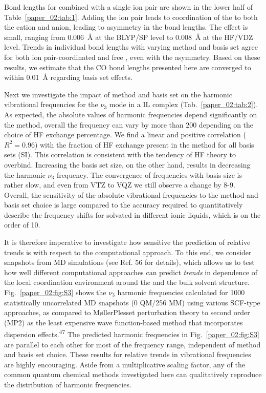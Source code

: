 Bond lengths for  combined with a single ion pair are shown in the lower half of Table~\ref{paper_02:tab:1}. Adding the ion pair leads to coordination of the  to both the cation and anion, leading to asymmetry in the  bond lengths. The effect is small, ranging from \SI{0.006}{\angstrom} at the BLYP/SP level to \SI{0.008}{\angstrom} at the HF/VDZ level. Trends in individual  bond lengths with varying method and basis set agree for both ion pair-coordinated  and free , even with the asymmetry. Based on these results, we estimate that the CO bond lengths presented here are converged to within \SI{0.01}{\angstrom} regarding basis set effects.

Next we investigate the impact of method and basis set on the harmonic vibrational frequencies for the \(\nu_{3}\) mode in a \textendash{}IL complex (Tab.~\ref{paper_02:tab:2}). As expected, the absolute values of harmonic frequencies depend significantly on the method, overall the frequency can vary by more than \SI{200}{\wavenumber} depending on the choice of HF exchange percentage. We find a linear and positive correlation (\(R^{2} = 0.96\)) with the fraction of HF exchange present in the method for all basis sets (SI). This correlation is consistent with the tendency of HF theory to overbind. Increasing the basis set size, on the other hand, results in decreasing the harmonic  \(\nu_{3}\) frequency. The convergence of frequencies with basis size is rather slow, and even from VTZ to VQZ we still observe a change by \num{8}-\SI{9}{\wavenumber}. Overall, the sensitivity of the absolute vibrational frequencies to the method and basis set choice is large compared to the accuracy required to quantitatively describe the frequency shifts for  solvated in different ionic liquids, which is on the order of \SI{10}{\wavenumber}.

It is therefore imperative to investigate how sensitive the prediction of relative trends is with respect to the computational approach. To this end, we consider snapshots from MD simulations (see Ref. 56 for details), which allows us to test how well different computational approaches can predict \emph{trends} in dependence of the local coordination environment around the  and the bulk solvent structure. Fig.~\ref{paper_02:fig:S3} shows the  \(\nu_{3}\) harmonic frequencies calculated for \num{1000} statistically uncorrelated MD snapshots (0 QM/256 MM) using various SCF-type approaches, as compared to M\o{}ller\textendash{}Plesset perturbation theory to second order (MP2) as the least expensive wave function-based method that incorporates dispersion effects.\textsuperscript{47} The predicted harmonic frequencies in Fig.~\ref{paper_02:fig:S3} are parallel to each other for most of the frequency range, independent of method and basis set choice. These results for relative trends in vibrational frequencies are highly encouraging. Aside from a multiplicative scaling factor, any of the common quantum chemical methods investigated here can qualitatively reproduce the distribution of harmonic frequencies.

